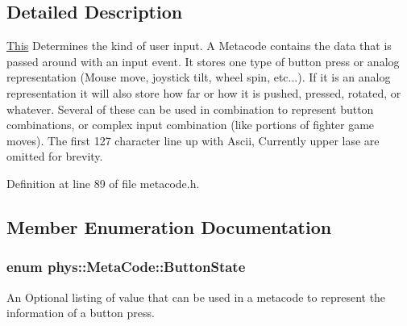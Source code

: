 \subsection{Detailed Description}
\hyperlink{structThis}{This} Determines the kind of user input. A Metacode contains the data that is passed around with an input event. It stores one type of button press or analog representation (Mouse move, joystick tilt, wheel spin, etc...). If it is an analog representation it will also store how far or how it is pushed, pressed, rotated, or whatever. Several of these can be used in combination to represent button combinations, or complex input combination (like portions of fighter game moves). The first 127 character line up with Ascii, Currently upper lase are omitted for brevity. 

Definition at line 89 of file metacode.h.



\subsection{Member Enumeration Documentation}
\hypertarget{classphys_1_1MetaCode_a2fdfb26b3e50ceb0ccc60bfc4c3d6ac2}{
\subsubsection[{ButtonState}]{\setlength{\rightskip}{0pt plus 5cm}enum {\bf phys::MetaCode::ButtonState}}}
\label{da/dc9/classphys_1_1MetaCode_a2fdfb26b3e50ceb0ccc60bfc4c3d6ac2}


An Optional listing of value that can be used in a metacode to represent the information of a button press. 

